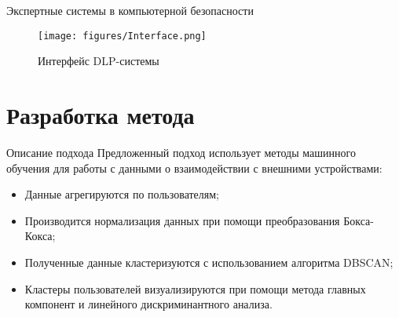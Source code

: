 \documentclass{beamer}
\begin{document}
\begin{frame}{Экспертные системы в компьютерной безопасности}
    \begin{figure}
        \centering
        \texttt{[image: figures/Interface.png]}
        \caption{Интерфейс DLP-системы}
    \end{figure}
\end{frame}

\section{Разработка метода}
\begin{frame}{Описание подхода}
    Предложенный подход использует методы машинного обучения для работы с данными о взаимодействии с внешними устройствами:
    \begin{itemize}
        \item Данные агрегируются по пользователям;
        \item Производится нормализация данных при помощи преобразования Бокса-Кокса;
        \item Полученные данные кластеризуются с использованием алгоритма DBSCAN;
        \item Кластеры пользователей визуализируются при помощи метода главных компонент и линейного дискриминантного анализа.
    \end{itemize}
\end{frame}
\end{document}
